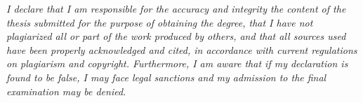 \thispagestyle{empty}
\vspace*{\fill}
\noindent\textit{I declare that I am responsible for the accuracy and integrity the content of the thesis submitted for the purpose of obtaining the degree, that I have not plagiarized all or part of the work produced by others, and that all sources used have been properly acknowledged and cited, in accordance with current regulations on plagiarism and copyright. Furthermore, I am aware that if my declaration is found to be false, I may face legal sanctions and my admission to the final examination may be denied.}
\vspace*{\fill}

